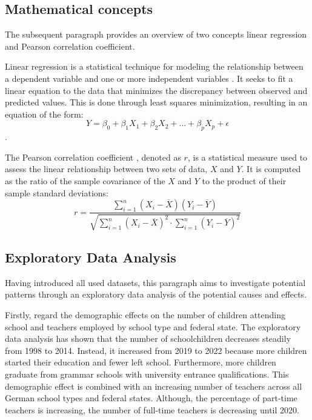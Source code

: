 \subsection{Mathematical concepts}
The subsequent paragraph provides an overview of two concepts linear regression and Pearson correlation coefficient.

Linear regression is a statistical technique for modeling the relationship between a dependent variable and one or more independent variables \cite[p.~71]{James2013-il}. It seeks to fit a linear equation to the data that minimizes the discrepancy between observed and predicted values. This is done through least squares minimization, resulting in an equation of the form:
\begin{equation}
    Y = \beta_0 + \beta_1 X_1 + \beta_2 X_2 +  ...+ \beta_p X_p + \epsilon 
\end{equation}.

The Pearson correlation coefficient \cite{rodgers_thirteen_1988}, denoted as $r$, is a statistical measure used to assess the linear relationship between two sets of data, $X$ and $Y$. It is computed as the ratio of the sample covariance of the $X$ and $Y$ to the product of their sample standard deviations:
\begin{equation}
    r = \frac{\sum_{i=1}^n (X_i - \overline{X}) (Y_i - \overline{Y})}{\sqrt{\sum_{i=1}^n(X_i-\overline{X})^2 \cdot \sum_{i=1}^n(Y_i-\overline{Y})^2}}
\end{equation}


\subsection{Exploratory Data Analysis}

Having introduced all used datasets, this paragraph aims to investigate potential patterns through an exploratory data analysis of the potential causes and effects. 

Firstly, regard the demographic effects on the number of children attending school and teachers employed by school type and federal state. The exploratory data analysis has shown that the number of schoolchildren decreases steadily from 1998 to 2014. Instead, it increased from 2019 to 2022 because more children started their education and fewer left school. Furthermore, more children graduate from grammar schools with university entrance qualifications. This demographic effect is combined with an increasing number of teachers across all German school types and federal states. Although, the percentage of part-time teachers is increasing, the number of full-time teachers is decreasing until 2020.

